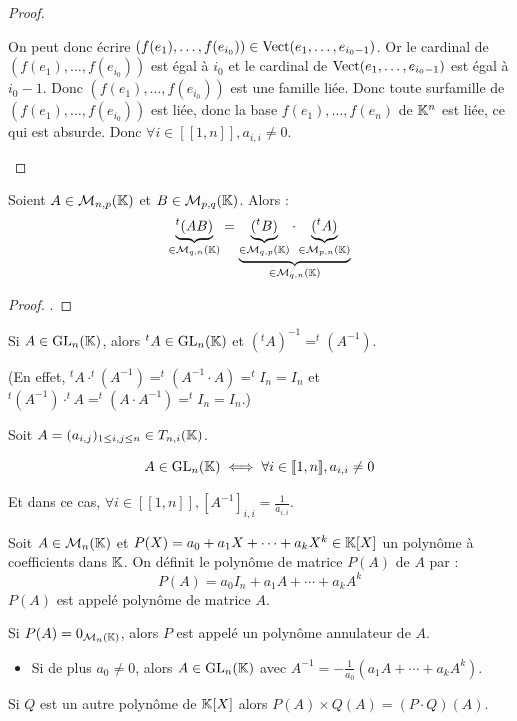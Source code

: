 \documentclass[12pt, a4paper]{report}
\begin{document}
\begin{proof}
\begin{outline}
        \2 On peut donc écrire $(f(e_1),\dots,f(e_{i_0})) \in \mathrm{Vect}(e_1,\dots,e_{i_0-1})$.
        \2 Or le cardinal de $(f(e_1),\dots,f(e_{i_0}))$ est égal à $i_0$ et le cardinal de $\mathrm{Vect}(e_1,\dots,e_{i_0-1})$ est égal à $i_0-1$.
        \2 Donc $(f(e_1),\dots,f(e_{i_0}))$ est une famille liée.
        \2 Donc toute surfamille de $(f(e_1),\dots,f(e_{i_0}))$ est liée, donc la base $f(e_1),\dots,f(e_n)$ de $\mathbb{K}^n$ est liée, ce qui est absurde.
        \2 Donc $\forall i \in [\![1,n]\!], a_{i,i} \ne 0$.
    \end{outline}
\end{proof}

\begin{property}
    Soient $A \in \mathcal M_{n,p}(\mathbb{K})$ et $B \in \mathcal M_{p,q}(\mathbb{K})$. Alors :
    $$\underbrace{^t(AB)}_{\in \mathcal M_{q,n}(\mathbb{K})} = \underbrace{\underbrace{(^tB)}_{\in \mathcal M_{q,p}(\mathbb{K})} \cdot \underbrace{(^tA)}_{\in \mathcal M_{p,n}(\mathbb{K})}}_{\in \mathcal M_{q,n}(\mathbb{K})}$$
\end{property}

\begin{proof}
.
\end{proof}

\begin{consequence}
    Si $A \in \mathrm{GL}_n(\mathbb{K})$, alors $^tA \in \mathrm{GL}_n(\mathbb{K})$ et $(^tA)^{-1} = ^t(A^{-1})$.

    (En effet, $^tA \cdot ^t(A^{-1}) = ^t(A^{-1} \cdot A) = ^tI_n = I_n$ et $^t(A^{-1}) \cdot ^tA = ^t(A \cdot A^{-1}) = ^tI_n = I_n$.)
\end{consequence}

\begin{consequence}
    Soit $A = (a_{i,j})_{1 \le i,j \le n} \in T_{n,i}(\mathbb{K})$.
    
    $$A \in \mathrm{GL}_n(\mathbb{K}) \iff \forall i \in [\![1,n]\!], a_{i,i} \ne 0$$

    Et dans ce cas, $\forall i \in [\![1,n]\!], [A^{-1}]_{i,i} = \frac{1}{a_{i,i}}$.
\end{consequence}

\begin{remark}
    Soit $A \in \mathcal M_n(\mathbb{K})$ et $P(X) = a_0 + a_1 X + \cdots + a_k X^k \in \mathbb{K}[X]$ un polynôme à coefficients dans $\mathbb{K}$. On définit le polynôme de matrice $P(A)$ de $A$ par :
    $$P(A) = a_0 I_n + a_1 A + \cdots + a_k A^k$$
    $P(A)$ est appelé polynôme de matrice $A$.

    Si $P(A) = 0_{\mathcal M_n(\mathbb{K})}$, alors $P$ est appelé un polynôme annulateur de $A$.

    \begin{itemize} \item[$\rightarrow$] Si de plus $a_0 \ne 0$, alors $A \in \mathrm{GL}_n(\mathbb{K})$ avec $A^{-1} = -\frac{1}{a_0}(a_1 A + \cdots + a_k A^k)$. \end{itemize}

    Si $Q$ est un autre polynôme de $\mathbb{K}[X]$ alors $P(A) \times Q(A) = (P \cdot Q)(A)$.
\end{remark}
\end{document}
